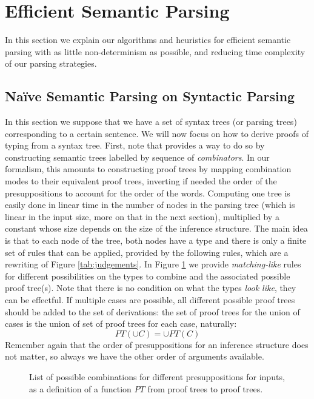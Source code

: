 \section{Efficient Semantic Parsing}
\label{sec:parsing}
In this section we explain our algorithms and heuristics for efficient semantic
parsing with as little non-determinism as possible, and reducing time complexity
of our parsing strategies.

\subsection{Naïve Semantic Parsing on Syntactic Parsing}
In this section we suppose that we have a set of syntax trees (or parsing trees) corresponding to a certain
sentence.
We will now focus on how to derive proofs of typing from a syntax tree.
First, note that \cite{bumfordEffectdrivenInterpretationFunctors2025} provides a way to do so by constructing
semantic trees labelled by sequence of \emph{combinators}.
In our formalism, this amounts to constructing proof trees by mapping combination modes to their equivalent proof
trees, inverting if needed the order of the presuppositions to account for the order of the words.
Computing one tree is easily done in linear time in the number of nodes in the parsing tree (which is linear in the input size,
more on that in the next section), multiplied by a constant whose size depends on the size of the inference
structure.
The main idea is that to each node of the tree, both nodes have a type and there is only a finite set of rules
that can be applied, provided by the following rules, which are a rewriting of Figure \ref{tab:judgements}.
In Figure \ref{tab:proof-trees} we provide \emph{matching-like} rules for different possibilities on the types to
combine and the associated possible proof tree(s).
Note that there is no condition on what the types \emph{look like}, they can be effectful.
If multiple cases are possible, all different possible proof trees should be added to the set of derivations: the
set of proof trees for the union of cases is the union of set of proof trees for each case, naturally:
\begin{equation*}
	PT\left( \cup C \right) = \cup PT(C)
\end{equation*}
Remember again that the order of presuppositions for an inference structure does not matter, so always we have the
other order of arguments available.

\begin{figure}
	\centering
	
	\caption{List of possible combinations for different presuppositions for inputs, as a definition of a function
		$PT$ from proof trees to proof trees.}
	\label{tab:proof-trees}
\end{figure}

